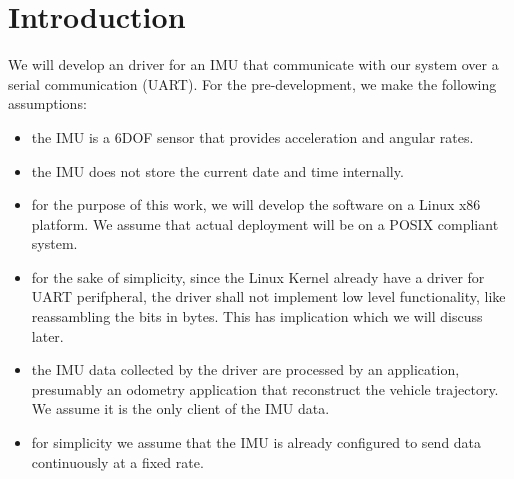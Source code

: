 \section{Introduction}
We will develop an driver for an IMU that communicate with our system over a serial communication (UART).
For the pre-development, we make the following assumptions:
\begin{itemize}
    \item the IMU is a 6DOF sensor that provides acceleration and angular rates.
    \item the IMU does not store the current date and time internally.
    \item for the purpose of this work, we will develop the software on a Linux x86 platform. We assume that actual deployment will be on a POSIX compliant system.
    \item for the sake of simplicity, since the Linux Kernel already have a driver for UART perifpheral, the driver shall not implement low level functionality, like reassambling the bits in bytes. This has implication which we will discuss later.
    \item the IMU data collected by the driver are processed by an application, presumably an odometry application that reconstruct the vehicle trajectory.
    We assume it is the only client of the IMU data.
    \item for simplicity we assume that the IMU is already configured to send data continuously at a fixed rate.
\end{itemize}
